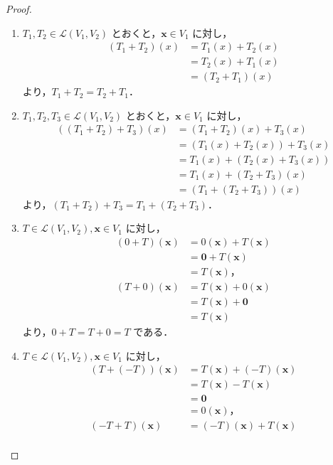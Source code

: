 \documentclass{jlreq}
\theoremstyle{definition}
\begin{document}
      \begin{proof}
        \mbox{}
        \begin{enumerate}
          \item $T_1,T_2 \in \mathcal{L}(V_1,V_2)$ とおくと，$\bm{x} \in V_1$ に対し，
            \begin{align*}
              (T_1+T_2)(x) &= T_1(x)+T_2(x) \\
              &= T_2(x)+T_1(x) \\
              &= (T_2+T_1)(x)
            \end{align*}
            より，$T_1+T_2=T_2+T_1$．
          \item $T_1,T_2,T_3 \in \mathcal{L}(V_1,V_2)$ とおくと，$\bm{x} \in V_1$ に対し，
            \begin{align*}
              ((T_1+T_2)+T_3)(x) &= (T_1+T_2)(x)+T_3(x) \\
              &= (T_1(x)+T_2(x))+T_3(x) \\
              &= T_1(x)+(T_2(x)+T_3(x)) \\
              &= T_1(x)+(T_2+T_3)(x) \\
              &= (T_1+(T_2+T_3))(x)
            \end{align*}
            より，$(T_1+T_2)+T_3=T_1+(T_2+T_3)$．
          \item $T \in \mathcal{L}(V_1,V_2), \bm{x} \in V_1$ に対し，
            \begin{align*}
              (0+T)(\bm{x}) &= 0(\bm{x})+T(\bm{x}) \\
              &= \bm{0}+T(\bm{x}) \\
              &= T(\bm{x})，\\
              (T+0)(\bm{x}) &= T(\bm{x})+0(\bm{x}) \\
              &= T(\bm{x})+\bm{0} \\
              &= T(\bm{x})
            \end{align*}
            より，$0+T=T+0=T$ である．
          \item $T \in \mathcal{L}(V_1,V_2), \bm{x} \in V_1$ に対し，
            \begin{align*}
              (T+(-T))(\bm{x}) &= T(\bm{x})+(-T)(\bm{x}) \\
              &= T(\bm{x})-T(\bm{x}) \\
              &= \bm{0} \\
              &= 0(\bm{x})，\\
              (-T+T)(\bm{x}) &= (-T)(\bm{x})+T(\bm{x}) \\

\end{align*}
\end{enumerate}
\end{proof}
\end{document}
